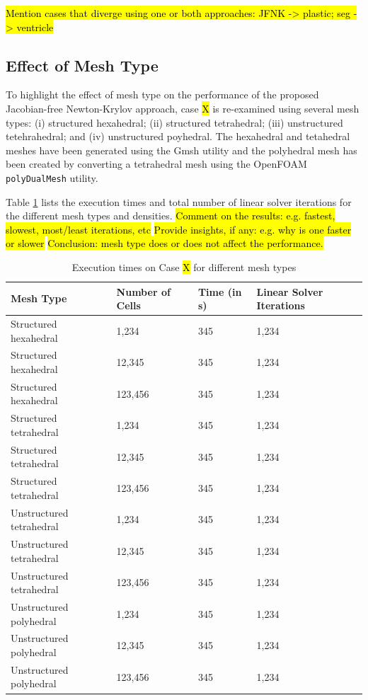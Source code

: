\documentclass[sn-mathphys,Numbered]{sn-jnl}%
\begin{document}
\hl{Mention cases that diverge using one or both approaches: JFNK -> plastic; seg -> ventricle}


\subsection{Effect of Mesh Type}
To highlight the effect of mesh type on the performance of the proposed Jacobian-free Newton-Krylov approach, case \hl{X} is re-examined using several mesh types:
(i) structured hexahedral; (ii) structured tetrahedral; (iii) unstructured tetehrahedral; and (iv) unstructured poyhedral.
The hexahedral and tetahedral meshes have been generated using the Gmsh utility \citep{geuzaine2009gmsh} and the polyhedral mesh has been created by converting a tetrahedral mesh using the OpenFOAM \texttt{polyDualMesh} utility.

Table \ref{tab:mesh_types} lists the execution times and total number of linear solver iterations for the different mesh types and densities.
\hl{Comment on the results: e.g. fastest, slowest, most/least iterations, etc}
\hl{Provide insights, if any: e.g. why is one faster or slower}
\hl{Conclusion: mesh type does or does not affect the performance.}
\begin{table}[htb]
	\centering
		\begin{tabular}{llll}
			\hline
			Mesh Type & Number of Cells & Time (in s) & Linear Solver Iterations  \\
			\hline 
			Structured hexahedral & 1,234 & 345 & 1,234  \\
			Structured hexahedral & 12,345 & 345 & 1,234  \\
			Structured hexahedral & 123,456 & 345 & 1,234  \\
			Structured tetrahedral & 1,234 & 345 & 1,234  \\
			Structured tetrahedral & 12,345 & 345 & 1,234  \\
			Structured tetrahedral & 123,456 & 345 & 1,234  \\
			Unstructured tetrahedral & 1,234 & 345 & 1,234  \\
			Unstructured tetrahedral & 12,345 & 345 & 1,234  \\
			Unstructured tetrahedral & 123,456 & 345 & 1,234  \\
			Unstructured polyhedral & 1,234 & 345 & 1,234  \\
			Unstructured polyhedral & 12,345 & 345 & 1,234  \\
			Unstructured polyhedral & 123,456 & 345 & 1,234  \\
			\hline
		\end{tabular}
	\caption{Execution times on Case \hl{X} for different mesh types}
	\label{tab:mesh_types}
\end{table}
\end{document}

